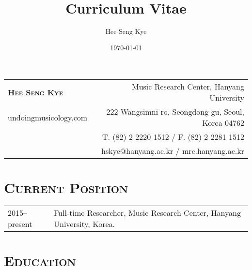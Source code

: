 \documentclass[letter,11pt]{article}
\title{Curriculum Vitae}
\author{Hee Seng Kye}
\date{\today}
\begin{document}
  \renewcommand{\headrulewidth}{0pt}
  \fancyhf{}
 
  \fancyfoot[RE,RO]{\small \thepage}
  
  \raggedright \parindent=15pt
  
%  
%  
  
  \hspace*{-0.8cm}
  \begin{tabular}{p{7.85cm} r}
    {\LARGE \textsc{\textbf{Hee Seng Kye}}} & Music Research Center, Hanyang University\\
    undoingmusicology.com & 222 Wangsimni-ro, Seongdong-gu, Seoul, Korea 04762\\
    & T. (82) 2 2220 1512 / F. (82) 2 2281 1512\\
    & hskye@hanyang.ac.kr / mrc.hanyang.ac.kr
  \end{tabular}
  
  \vspace{8mm}
  
  \section*{\textsc{Current Position}}
  
  \hspace*{-0.25cm}
  \begin{tabular}{p{2.5cm} l}
    2015--present & Full-time Researcher, Music Research Center, Hanyang University, Korea.
  \end{tabular}
  
  \vspace*{2.5mm}
  
  \section*{\textsc{Education}}
  
\end{document}
